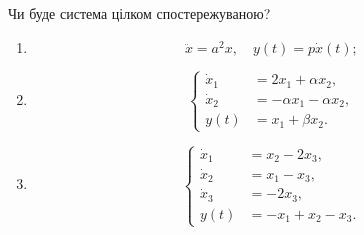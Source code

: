 \begin{problem}
    Чи буде система цілком спостережуваною?
    \begin{enumerate}
        \item \[\ddot x = a^2 x, \quad y(t) = p\dot x(t); \]
        \item \begin{equation*}
            \left\{
                \begin{aligned}
                    \dot x_1 &= 2x_1 + \alpha x_2, \\
                    \dot x_2 &= - \alpha x_1 - \alpha x_2, \\
                    y(t) &= x_1 + \beta x_2.
                \end{aligned}
            \right.
        \end{equation*}
        \item \begin{equation*}
            \left\{
                \begin{aligned}
                    \dot x_1 &= x_2 - 2 x_3, \\
                    \dot x_2 &= x_1 - x_3, \\
                    \dot x_3 &= - 2 x_3, \\
                    y(t) &= - x_1 + x_2 - x_3.
                \end{aligned}
            \right.
        \end{equation*}
    \end{enumerate}
\end{problem}

